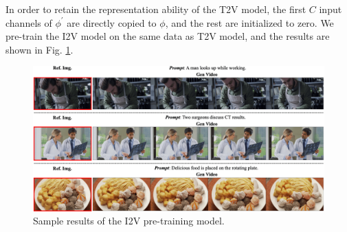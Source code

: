 In order to retain the representation ability of the T2V model, the first $C$ input channels of $\phi^{\prime}$ are directly copied to $\phi$, and the rest are initialized to zero. We pre-train the I2V model on the same data as T2V model, and the results are shown in Fig. \ref{fig:i2v_result}.
\begin{figure}[t]
    \centering
    \includegraphics[width=1\linewidth]{figures/i2v_pretraining_result.png}
    \caption{Sample results of the I2V pre-training model.}
    \label{fig:i2v_result}
\end{figure}
